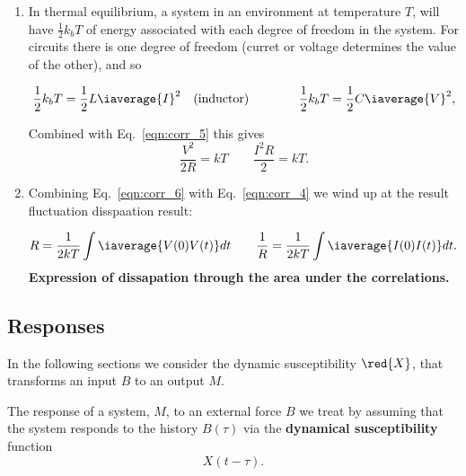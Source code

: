 \begin{enumerate}
 \item In thermal equilibrium,  a system in an environment at  temperature $ T $,
   will have $ \frac{1}{2}k_bT $ of energy associated with each degree of freedom
   in the system.  For circuits there is one degree of freedom (curret or voltage
   determines the value of the other), and so

    \begin{equation}
      \frac{1}{2}k_bT=\frac{1}{2}L\iaverage{I}^2 \quad(\text{inductor})\qquad\qquad \frac{1}{2}k_bT = \frac{1}{2}C\iaverage{V}^2,
    \end{equation}

    \noindent Combined with Eq.~\eqref{eqn:corr_5} this gives
    \begin{equation}\label{eqn:corr_6}
      \frac{V^2}{2R} = kT\qquad \frac{I^2R}{2} = kT.
    \end{equation}

  \item Combining  Eq.~\eqref{eqn:corr_6} with Eq.~\eqref{eqn:corr_4} we  wind up
    at the result fluctuation disspaation result:
    \begin{framed}\noindent

    \[
      {R}                                                                       =
      \frac{1}{2kT}\int\iaverage{V(0)V(t)}dt\qquad\frac{1}{R}=\frac{1}{2kT}\int\iaverage{I(0)I(t)}dt.
    \]
    \textbf{Expression of dissapation through the area under the correlations.}

  \end{framed}
\end{enumerate}

\newpage\subsection{Responses}
\begin{framed}\noindent

  In the following  sections we consider the dynamic susceptibility  $ \red{X} $,
  that transforms an input $ B $ to an output $ M $.

\end{framed}
The response of a system,  $ M$, to an external force $ B  $ we treat by assuming
that  the system  responds to  the  history $  B(\tau) $  via the  \textbf{dynamical
  susceptibility} function
\begin{equation}\label{eqn:response_1}
  X(t-\tau).
\end{equation}

